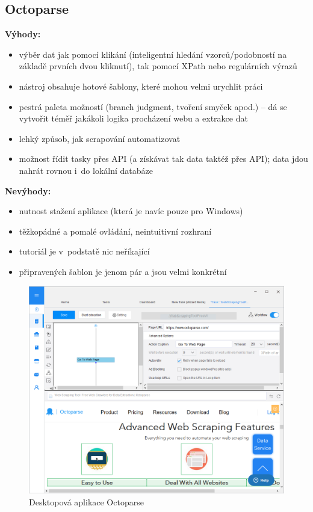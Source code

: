 \documentclass[thesis=B,czech]{FITthesis}[2012/06/26]
\begin{document}
\subsection{Octoparse}
\textbf{Výhody:}
\begin{itemize}
	\item výběr dat jak pomocí klikání (inteligentní hledání vzorců/podobností na základě prvních dvou kliknutí), tak pomocí XPath nebo regulárních výrazů
	\item nástroj obsahuje hotové šablony, které mohou velmi urychlit práci
	\item pestrá paleta možností (branch judgment, tvoření smyček apod.) -- dá se vytvořit téměř jakákoli logika procházení webu a extrakce dat
	\item lehký způsob, jak scrapování automatizovat
	\item možnost řídit tasky přes API (a získávat tak data taktéž přes API); data jdou nahrát rovnou i~do lokální databáze
\end{itemize}
\textbf{Nevýhody:}
\begin{itemize}
	\item nutnost stažení aplikace (která je navíc pouze pro Windows)
	\item těžkopádné a pomalé ovládání, neintuitivní rozhraní
	\item tutoriál je v~podstatě nic neříkající
	\item připravených šablon je jenom pár a jsou velmi konkrétní
\end{itemize}
\begin{figure}[h]
	\includegraphics[width=\linewidth]{images/Octoparse.png}
	\caption{Desktopová aplikace Octoparse~\cite[snímek pořídil autor]{octoparse}}
	\label{fig:octoparse}
\end{figure}
\end{document}
